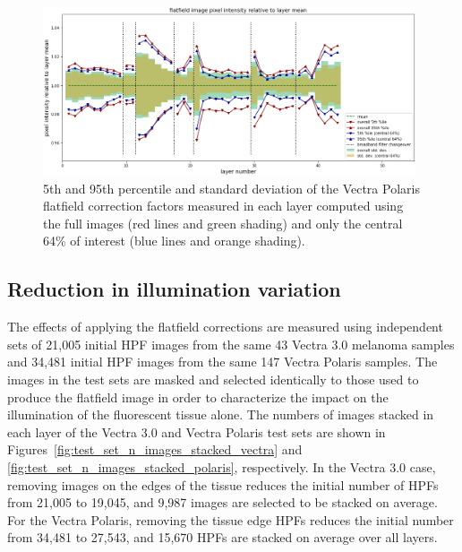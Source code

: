 \documentclass[letterpaper,11pt]{article}
\begin{document}
\begin{figure}[!ht]
\centering
\includegraphics[width=0.98\textwidth]{images/results/flatfield_pixel_intensities_polaris}
\caption{\footnotesize 5th and 95th percentile and standard deviation of the Vectra Polaris flatfield correction factors measured in each layer computed using the full images (red lines and green shading) and only the central 64\% of interest (blue lines and orange shading).}
\label{fig:flatfield_pixel_intensities_polaris}
\end{figure} 

\clearpage

\subsection{Reduction in illumination variation}
\label{ssec:reduction_in_illumination_variation}

The effects of applying the flatfield corrections are measured using independent sets of 21,005 initial HPF images from the same 43 Vectra 3.0 melanoma samples and 34,481 initial HPF images from the same 147 Vectra Polaris samples. The images in the test sets are masked and selected identically to those used to produce the flatfield image in order to characterize the impact on the illumination of the fluorescent tissue alone. The numbers of images stacked in each layer of the Vectra 3.0 and Vectra Polaris test sets are shown in Figures~\ref{fig:test_set_n_images_stacked_vectra} and \ref{fig:test_set_n_images_stacked_polaris}, respectively. In the Vectra 3.0 case, removing images on the edges of the tissue reduces the initial number of HPFs from 21,005 to 19,045, and 9,987 images are selected to be stacked on average. For the Vectra Polaris, removing the tissue edge HPFs reduces the initial number from 34,481 to 27,543, and 15,670 HPFs are stacked on average over all layers.
\end{document}
